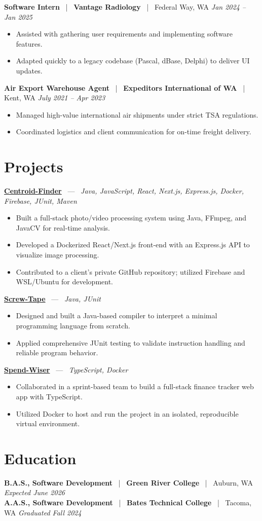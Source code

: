 \documentclass[10pt, letterpaper]{article}
\newcommand{\jobhead}[4]{%
  \vspace{5pt}%
  {\bfseries\color{dark}#1}%
  ~{\color{light}|}~%
  {\bfseries\color{navy}#2}%
  ~{\color{light}|}~%
  {\color{light}#3}%
  \hfill{\color{light}\small\textit{#4}}\\[-2pt]%
}
\newcommand{\projhead}[3]{%
  \vspace{5pt}%
  {\bfseries\color{dark}\href{#2}{#1}}%
  ~{\color{light}---}~%
  {\color{light}\small\textit{#3}}\\[-2pt]%
}
\begin{document}
\jobhead{Software Intern}{Vantage Radiology}{Federal Way, WA}{Jan 2024 – Jan 2025}
\begin{itemize}
  \item Assisted with gathering user requirements and implementing software features.
  \item Adapted quickly to a legacy codebase (Pascal, dBase, Delphi) to deliver UI updates.
\end{itemize}

\jobhead{Air Export Warehouse Agent}{Expeditors International of WA}{Kent, WA}{July 2021 – Apr 2023}
\begin{itemize}
  \item Managed high-value international air shipments under strict TSA regulations.
  \item Coordinated logistics and client communication for on-time freight delivery.
\end{itemize}

\section{Projects}

\projhead{Centroid-Finder}{https://github.com/xavierb117/centroid-finder}{Java, JavaScript, React, Next.js, Express.js, Docker, Firebase, JUnit, Maven}
\begin{itemize}
  \item Built a full-stack photo/video processing system using Java, FFmpeg, and JavaCV for real-time analysis.
  \item Developed a Dockerized React/Next.js front-end with an Express.js API to visualize image processing.
  \item Contributed to a client's private GitHub repository; utilized Firebase and WSL/Ubuntu for development.
\end{itemize}

\projhead{Screw-Tape}{https://github.com/timmyd4/screwtape}{Java, JUnit}
\begin{itemize}
  \item Designed and built a Java-based compiler to interpret a minimal programming language from scratch.
  \item Applied comprehensive JUnit testing to validate instruction handling and reliable program behavior.
\end{itemize}

\projhead{Spend-Wiser}{https://github.com/JesseChum/w26-sdev372-spendwiser-finance-tracker}{TypeScript, Docker}
\begin{itemize}
  \item Collaborated in a sprint-based team to build a full-stack finance tracker web app with TypeScript.
  \item Utilized Docker to host and run the project in an isolated, reproducible virtual environment.
\end{itemize}

\section{Education}

\jobhead{B.A.S., Software Development}{Green River College}{Auburn, WA}{Expected June 2026}
\jobhead{A.A.S., Software Development}{Bates Technical College}{Tacoma, WA}{Graduated Fall 2024}
\end{document}
